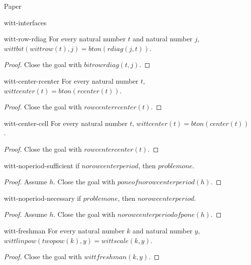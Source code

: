 \begin{lexlean}{Paper}
\begin{section}{witt-interfaces}
  \begin{theorem}{witt-row-rdiag}
  For every natural number \(t\) and natural number \(j\), \(wittbit(wittrow(t), j) = bton(rdiag(j, t))\).
  \begin{proof}
  Close the goal with \(bitrowrdiag(t, j)\).
  \end{proof}
  \end{theorem}

  \begin{theorem}{witt-center-rcenter}
  For every natural number \(t\), \(wittcenter(t) = bton(rcenter(t))\).
  \begin{proof}
  Close the goal with \(rowcenterrcenter(t)\).
  \end{proof}
  \end{theorem}

  \begin{theorem}{witt-center-cell}
  For every natural number \(t\), \(wittcenter(t) = bton(center(t))\).
  \begin{proof}
  Close the goal with \(rowcentercenter(t)\).
  \end{proof}
  \end{theorem}

  \begin{theorem}{witt-noperiod-sufficient}
  if \(norowcenterperiod\), then \(problemone\).
  \begin{proof}
  Assume \(h\).
  Close the goal with \(poneofnorowcenterperiod(h)\).
  \end{proof}
  \end{theorem}

  \begin{theorem}{witt-noperiod-necessary}
  if \(problemone\), then \(norowcenterperiod\).
  \begin{proof}
  Assume \(h\).
  Close the goal with \(norowcenterperiodofpone(h)\).
  \end{proof}
  \end{theorem}

  \begin{theorem}{witt-freshman}
  For every natural number \(k\) and natural number \(y\), \(wittlinpow(twopow(k), y) = wittscale(k, y)\).
  \begin{proof}
  Close the goal with \(wittfreshman(k, y)\).
  \end{proof}
  \end{theorem}


\end{section}
\end{lexlean}
